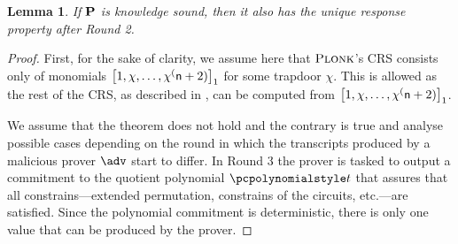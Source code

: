 \documentclass[runningheads,11pt]{llncs}
\newtheorem{lemma}[theorem]{Lemma}
\theoremstyle{definition}
\begin{document}
\begin{lemma}
	\label{lem:plonk_ur}
	If $\mathbf{P}$ is knowledge sound, then it also has the unique response property after Round 2.
\end{lemma}
\begin{proof}
	First, for the sake of clarity, we assume here that $\textsc{Plonk}$'s CRS consists only of monomials $\left[1, \chi, \ldots, \chi^(\mathsf{n} + 2)\right]_{1}$ for some trapdoor $\chi$. This is allowed as the rest of the CRS, as described in \cite{GabWilCio19}, can be computed from  $\left[1, \chi, \ldots, \chi^(\mathsf{n} + 2)\right]_{1}$.
	
	We assume that the theorem does not hold and the contrary is true and analyse possible cases depending on
  the round in which the transcripts produced by a malicious prover $\adv$ start
  to differ.
	In Round 3 the prover is tasked to output a commitment to the quotient
  polynomial $\p{t}$ that assures that all constrains---extended permutation,
  constrains of the circuits, etc.---are satisfied. Since the polynomial
  commitment is deterministic, there is only one value that can be produced by
  the prover. 
	

\end{proof}
\end{document}
